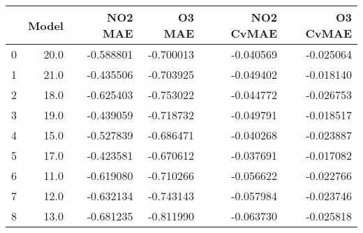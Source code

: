 \begin{tabular}{lrrrrr}
\toprule
{} &  Model &   NO2 MAE &    O3 MAE &  NO2 CvMAE &  O3 CvMAE \\
\midrule
0 &   20.0 & -0.588801 & -0.700013 &  -0.040569 & -0.025064 \\
1 &   21.0 & -0.435506 & -0.703925 &  -0.049402 & -0.018140 \\
2 &   18.0 & -0.625403 & -0.753022 &  -0.044772 & -0.026753 \\
3 &   19.0 & -0.439059 & -0.718732 &  -0.049791 & -0.018517 \\
4 &   15.0 & -0.527839 & -0.686471 &  -0.040268 & -0.023887 \\
5 &   17.0 & -0.423581 & -0.670612 &  -0.037691 & -0.017082 \\
6 &   11.0 & -0.619080 & -0.710266 &  -0.056622 & -0.022766 \\
7 &   12.0 & -0.632134 & -0.743143 &  -0.057984 & -0.023746 \\
8 &   13.0 & -0.681235 & -0.811990 &  -0.063730 & -0.025818 \\
\bottomrule
\end{tabular}
